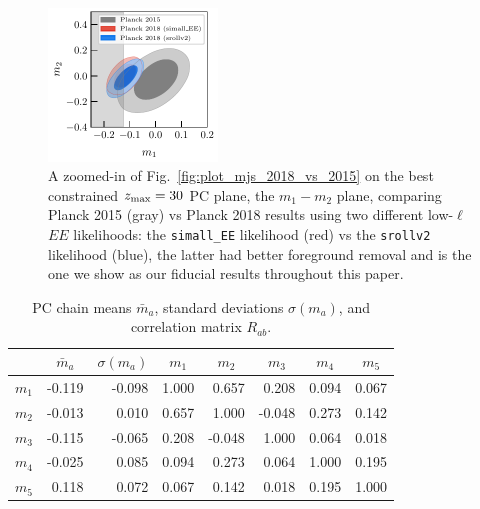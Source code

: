 \documentclass[prd,twocolumn,amsmath,amssymb,floatfix,superscriptaddress,nofootinbib]{revtex4-1}
\newcommand{\zmax}{z_{\rm max}}
\begin{document}
\begin{figure}
\includegraphics[width=0.40\textwidth]{plots/plot_m1_m2_t18_r12_t19_t20_vs_pl18_pc_zmax30_pliklite_0930_vs_pl18_pc_zmax30_pliklite_srollv2_1015.pdf}
\caption{A zoomed-in of Fig.~\ref{fig:plot_mjs_2018_vs_2015} on the best constrained $\zmax=30$ PC plane, the $m_1-m_2$ plane, comparing Planck 2015 (gray) vs Planck 2018 results using two different low-$\ell$ $EE$ likelihoods: the \texttt{simall\_EE} likelihood (red) vs the \texttt{srollv2} likelihood (blue), the latter had better foreground removal and is the one we show as our fiducial results throughout this paper.
}
\label{fig:plot_m1m2_2015_vs_2018}
\end{figure}

\begin{table}[b]
\centering
\caption{PC chain means $\bar m_a$, standard deviations $\sigma(m_a)$, and correlation matrix $R_{ab}$.}
\label{tab:PC_stats}
\begin{tabular}{|r | r r@{\hskip 0.06in}|r r r r r|}
\hline
		
			  &  \multicolumn{1}{c}{$\bar m_a$} & \multicolumn{1}{c}{$\sigma(m_a)$}	 & \multicolumn{1}{|c}{$m_1$} & \multicolumn{1}{c}{$m_2$} & \multicolumn{1}{c}{$m_3$} & \multicolumn{1}{c}{$m_4$} & \multicolumn{1}{c|}{$m_5$} 
		\\ \hline
		

$m_1$ & -0.119 & -0.098 & 1.000 & 0.657 & 0.208 & 0.094 & 0.067 \\ 
$m_2$ & -0.013 & 0.010 & 0.657 & 1.000 & -0.048 & 0.273 & 0.142 \\ 
$m_3$ & -0.115 & -0.065 & 0.208 & -0.048 & 1.000 & 0.064 & 0.018 \\ 
$m_4$ & -0.025 & 0.085  & 0.094 & 0.273 & 0.064 & 1.000 & 0.195 \\ 
$m_5$ & 0.118 & 0.072  & 0.067 & 0.142 & 0.018 & 0.195 & 1.000 \\ 

\hline
\end{tabular}
\end{table}
\end{document}
